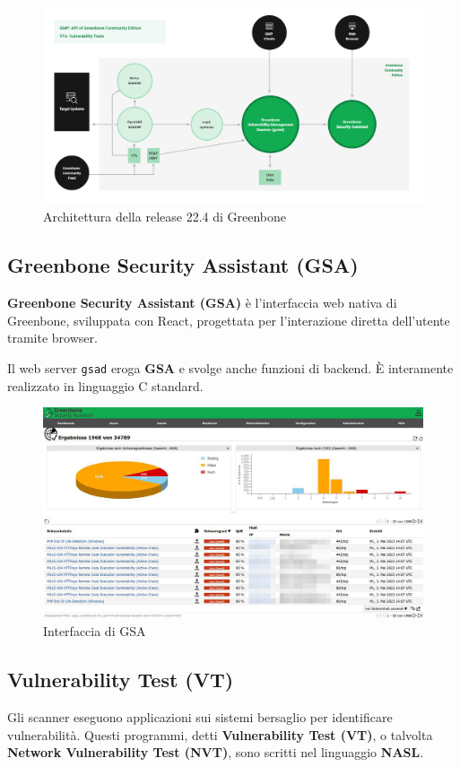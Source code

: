 \begin{figure}[h!]
    \includegraphics[width=\textwidth]{img/greenbone-community-22.4-architecture.png}
    \caption{Architettura della release 22.4 di Greenbone}
\end{figure}

\subsection{Greenbone Security Assistant (GSA)}
\textbf{Greenbone Security Assistant (GSA)} \cite{gsa} è l'interfaccia web nativa di Greenbone, sviluppata con React, progettata per l'interazione diretta dell'utente tramite browser.

Il web server \texttt{gsad} \cite{gsad} eroga \textbf{GSA} e svolge anche funzioni di backend. \`E interamente realizzato in linguaggio C standard.

\begin{figure}[h]
    \centering
    \includegraphics[width=\textwidth]{img/gsa.jpg}
    \caption{Interfaccia di GSA}
\end{figure}

\subsection{Vulnerability Test (VT)}
Gli scanner eseguono applicazioni sui sistemi bersaglio per identificare vulnerabilità. Questi programmi, detti \textbf{Vulnerability Test (VT)}, o talvolta \textbf{Network Vulnerability Test (NVT)}, sono scritti nel linguaggio \textbf{NASL}.

